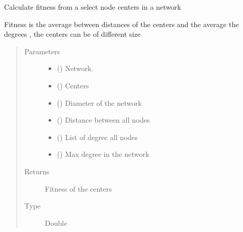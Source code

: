 \documentclass[letterpaper,10pt,english]{sphinxmanual}
\begin{document}

\begin{fulllineitems}
\label{\detokenize{Genetic:Genetic.Genetic.calculateFitness}}
Calculate fitness from a select node centers in a network

Fitness is the average between distances of the centers and the average the degrees , the centers can be of different size
\begin{quote}\begin{description}
\item[{Parameters}] \leavevmode\begin{itemize}
\item {} 
 () \textendash{} Network.

\item {} 
 () \textendash{} Centers

\item {} 
 () \textendash{} Diameter of the network

\item {} 
 () \textendash{} Distance between all nodes

\item {} 
 () \textendash{} List of degree all nodes

\item {} 
 () \textendash{} Max degree in the network

\end{itemize}

\item[{Returns}] \leavevmode
Fitness of the centers

\item[{Type}] \leavevmode
Double

\end{description}\end{quote}

\end{fulllineitems}
\end{document}
